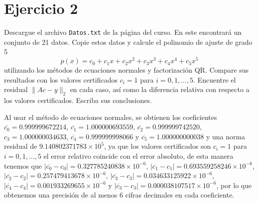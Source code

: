 
\section*{Ejercicio 2}
Descargue el archivo \texttt{Datos.txt} de la página del curso. En este encontrará un conjunto de 21 datos. Copie estos datos y calcule el polinomio de ajuste de grado 5
\[
p(x) = c_0 + c_1x + c_2x^2 + c_3x^3 + c_4x^4 + c_5x^5
\]
utilizando los métodos de ecuaciones normales y factorización QR. Compare sus resultados con los valores certificados $c_i = 1$ para $i = 0, 1, \dots, 5$. Encuentre el residual $\|Ac - y\|_2$ en cada caso, así como la diferencia relativa con respecto a los valores certificados. Escriba sus conclusiones.

\begin{solution}
Al usar el método de ecuaciones normales, se obtienen los coeficientes $\overline{c_0} = 0.999999672214$, $\overline{c_1} =1.000000693559 $, $\overline{c_2} = 0.999999742520$, $c_3 = 1.000000034633$, $\overline{c_4}=0.999999998066$ y $\overline{c_5}= 1.000000000038$ y una norma residual de $9.140802371783\times 10^{5}$, ya que los valores certificados son $c_i=1$ para $i=0,1,\ldots, 5$ el error relativo coincide con el error absoluto, de esta manera tenemos que $|\overline{c_0}-c_0|=0.327785240838 \times 10^{-6}$, $|\overline{c_1}-c_1|= 0.693559258246 \times 10^{-6}$, $|\overline{c_2}-c_2|= 0.257479413678 \times 10^{-6}$, $|\overline{c_3}-c_3|= 0.034633125922 \times 10^{-6}$, $|\overline{c_4}-c_4|= 0.001933269655 \times 10^{-6}$ y $|\overline{c_3}-c_3|= 0.000038107517 \times 10^{-6}$, por lo que obtenemos una precisión de al menos 6 cifras decimales en cada coeficiente.


\end{solution}
